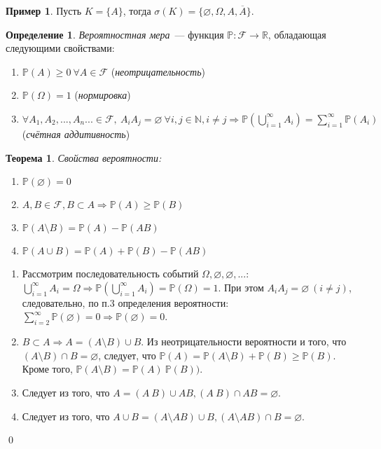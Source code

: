 \documentclass[oneside,final,14pt]{extreport}
\newcommand\myprob[1]{{\mathbb{P}(#1)}}
\renewenvironment{proof}{{\bfseries Доказательство.}}{\qed}
\newtheorem{thm}{Теорема}[section]
\theoremstyle{definition}
\newtheorem{defn}{Определение}[section]
\newtheorem*{exmp}{Пример}
\begin{document}
\begin{exmp}
    Пусть \( K = \{A\} \), тогда \( \sigma (K) = \{\varnothing, \Omega, A, \overline{A}\} \).
\end{exmp}

\begin{defn}
    {\it Вероятностная мера}~--- функция \( \mathbb{P}: \mathcal{F} \rightarrow \mathbb{R} \), обладающая следующими свойствами:

\begin{enumerate}
    \item \( \myprob{A} \geqslant 0~\forall A \in \mathcal{F} \) ({\it неотрицательность})
    \item \( \myprob{\Omega} = 1 \) ({\it нормировка})
    \item \( \forall A_1, A_2, ..., A_n... \in \mathcal{F},~ A_{i}A_{j} = \varnothing~ \forall i, j \in \mathbb{N}, i \ne j \Rightarrow \myprob{\bigcup\limits_{i=1}^\infty A_i} = \sum\limits_{i=1}^\infty \myprob{A_i} \) ({\it счётная аддитивность})
\end{enumerate}
\end{defn}

\begin{thm}
    Свойства вероятности:
    \begin{enumerate}
       \item \( \myprob{\varnothing}=0 \)
        \item \( A, B \in \mathcal{F}, B \subset A \Rightarrow \myprob{A} \geqslant \myprob{B} \)
       \item \( \myprob{A \setminus B} = \myprob{A} - \myprob{AB} \)
       \item \( \myprob{A \cup B} = \myprob{A} + \myprob{B} - \myprob{AB} \)
    \end{enumerate}
\end{thm}

\begin{proof}
    \begin{enumerate}
    \item Рассмотрим последовательность событий \( \Omega, \varnothing, \varnothing, ...\): \( \bigcup\limits_{i=1}^\infty A_i = \Omega \Rightarrow \myprob{\bigcup\limits_{i=1}^\infty A_i} = \myprob{\Omega} = 1 \). При этом \( A_{i}A_j = \varnothing~(i \ne j) \), следовательно, по п.3 определения вероятности: \( \sum\limits_{i=2}^\infty \myprob{\varnothing} = 0 \Rightarrow \myprob{\varnothing} = 0 \).
    \item \( B \subset A \Rightarrow A = (A \setminus B) \cup B \). Из неотрицательности вероятности и того, что \( (A \setminus B) \cap B = \varnothing \), следует, что \( \myprob{A} = \myprob{A \setminus B} + \myprob{B} \geqslant \myprob{B} \). Кроме того, \( \myprob{A \setminus B} = \myprob{A} \ \myprob{B})\).
    \item Следует из того, что \( A = (A \ B) \cup AB, (A \ B) \cap AB = \varnothing \).
    \item Следует из того, что \( A \cup B = (A \setminus AB) \cup B, (A \setminus AB) \cap B = \varnothing \).
\end{enumerate}
\end{proof}
\end{document}
